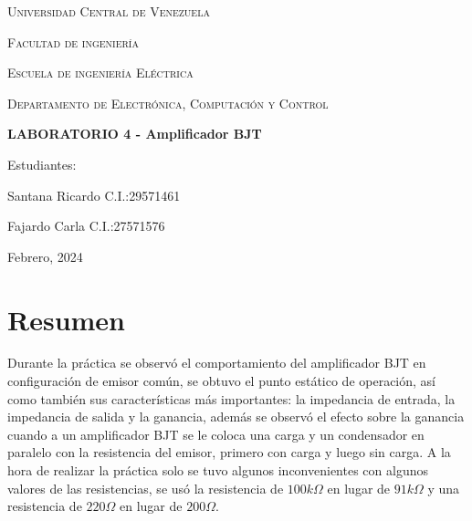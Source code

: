 \documentclass[12pt, a4paper]{article}
\begin{document}
    \begin{titlepage}
        \centering
        {\scshape\Large Universidad Central de Venezuela \par}
        {\scshape\Large Facultad de ingeniería \par}
        {\scshape\Large Escuela de ingeniería Eléctrica \par}
        {\scshape\Large Departamento de Electrónica, Computación y Control \par}

        \vspace{6cm}
        {\Large\bfseries LABORATORIO 4 - Amplificador BJT\par}
        \vspace{6cm}

        \vfill
        \begin{flushright}
            Estudiantes:\par
            Santana Ricardo C.I.:29571461 \par
            Fajardo Carla C.I.:27571576
            \vspace{1cm}  
        \end{flushright}
        \vfill
        {\large Febrero, 2024 \par}
    \end{titlepage}

    \tableofcontents

    \newpage

    \section{Resumen}

    Durante la práctica se observó el comportamiento del amplificador BJT en configuración de emisor común, se obtuvo el punto estático de operación, así como también sus características más importantes: la impedancia de entrada, la impedancia de salida y la ganancia, además se observó el efecto sobre la ganancia cuando a un amplificador BJT se le coloca una carga y un condensador en paralelo con la resistencia del emisor, primero con carga y luego sin carga. A la hora de realizar la práctica solo se tuvo algunos inconvenientes con algunos valores de las resistencias, se usó la resistencia de $100k\Omega$ en lugar de $91k\Omega$ y una resistencia de $220\Omega$ en lugar de $200\Omega$.
    
\end{document}
